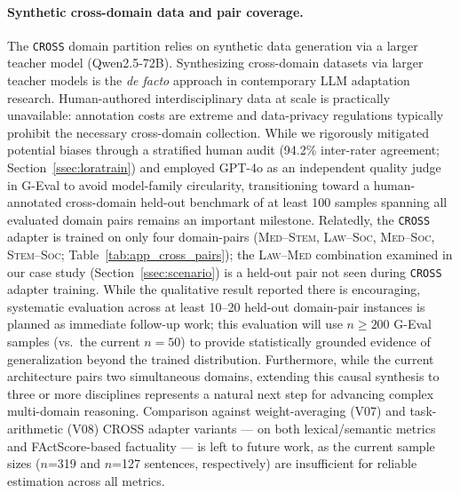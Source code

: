 \documentclass[a4paper,fleql]{cas-sc}
\begin{document}
\paragraph{Synthetic cross-domain data and pair coverage.}
The \texttt{CROSS} domain partition relies on synthetic data generation via a
larger teacher model (Qwen2.5-72B). Synthesizing cross-domain datasets via larger teacher models is the
\emph{de facto} approach in contemporary LLM adaptation research.
Human-authored interdisciplinary data at scale is practically unavailable:
annotation costs are extreme and data-privacy regulations typically prohibit
the necessary cross-domain collection. While we rigorously mitigated potential biases through
a stratified human audit (94.2\% inter-rater agreement;
Section~\ref{ssec:loratrain}) and employed GPT-4o as an independent quality
judge in G-Eval to avoid model-family circularity, transitioning toward a human-annotated cross-domain held-out benchmark
of at least 100 samples spanning all evaluated domain pairs remains an
important milestone. Relatedly, the \texttt{CROSS} adapter is trained on only four
domain-pairs (\textsc{Med}--\textsc{Stem}, \textsc{Law}--\textsc{Soc},
\textsc{Med}--\textsc{Soc}, \textsc{Stem}--\textsc{Soc};
Table~\ref{tab:app_cross_pairs}); the \textsc{Law}--\textsc{Med} combination
examined in our case study (Section~\ref{ssec:scenario}) is a held-out pair
not seen during \texttt{CROSS} adapter training. While the qualitative result reported there is encouraging, systematic
evaluation across at least 10--20 held-out domain-pair instances is planned
as immediate follow-up work; this evaluation will use $n{\geq}200$ G-Eval
samples (vs.\ the current $n{=}50$) to provide statistically grounded
evidence of generalization beyond the trained distribution. Furthermore, while the current architecture pairs
two simultaneous domains, extending this causal synthesis to three or more
disciplines represents a natural next step for advancing complex
multi-domain reasoning.
Comparison against weight-averaging (V07) and task-arithmetic (V08) CROSS adapter variants --- on both lexical/semantic metrics and FActScore-based factuality --- is left to future work, as the current sample sizes ($n$=319 and $n$=127 sentences, respectively) are insufficient for reliable estimation across all metrics.
\end{document}
